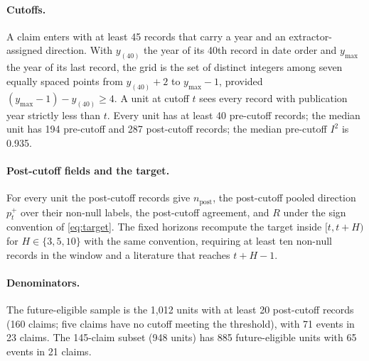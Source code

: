 \documentclass[11pt]{article}
\begin{document}
\paragraph{Cutoffs.} A claim enters with at least 45 records that carry a year and an
extractor-assigned direction. With $y_{(40)}$ the year of its 40th record in date order and
$y_{\max}$ the year of its last record, the grid is the set of distinct integers among seven
equally spaced points from $y_{(40)}+2$ to $y_{\max}-1$, provided $(y_{\max}-1)-y_{(40)}\ge4$. A
unit at cutoff $t$ sees every record with publication year strictly less than $t$. Every unit has at
least 40 pre-cutoff records; the median unit has 194 pre-cutoff and 287 post-cutoff records; the
median pre-cutoff $I^2$ is 0.935.

\paragraph{Post-cutoff fields and the target.} For every unit the post-cutoff records give
$n_{\text{post}}$, the post-cutoff pooled direction $p^{+}_t$ over their non-null labels, the
post-cutoff agreement, and $R$ under the sign convention of \cref{eq:target}. The fixed
horizons recompute the target inside $[t,t+H)$ for $H\in\{3,5,10\}$ with the same convention,
requiring at least ten non-null records in the window and a literature that reaches $t+H-1$.

\paragraph{Denominators.} The future-eligible sample is the 1{,}012 units with at least 20 post-cutoff
records (160 claims; five claims have no cutoff meeting the threshold), with 71 events in 23
claims. The 145-claim subset (948 units) has 885
future-eligible units with 65 events in 21 claims.
\end{document}
